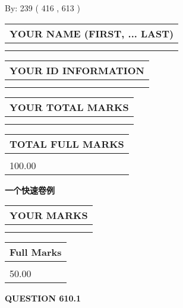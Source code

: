 \documentclass{ctexart}
\begin{document}
   
\hspace{1.0in} By: 
 239 ( 416 ,  613 )
   
   
   
   
\newpage 
\setcounter{page}{ 
   610001 } 
   
   
   
   
\noindent\begin{tabular}{|l|}
\hline
YOUR NAME (FIRST, ... LAST)  \\
\hline
 \\ 
 \\ 
\hline
\end{tabular}
\hspace{0.05in} \begin{tabular}{|l|}
\hline
 YOUR   ID   INFORMATION  \\
\hline
 \\ 
 \\ 
\hline
\end{tabular}
   
   
\vspace{0.2in}\noindent\begin{tabular}{|l|}
\hline
YOUR TOTAL MARKS  \\
\hline
 \\ 
 \\ 
\hline
\end{tabular}
\hspace{0.05in} \begin{tabular}{|l|}
\hline
TOTAL FULL MARKS  \\
\hline
 \\ 
100.00 \\
\hline
\end{tabular}
   
   
 \vspace{0.2in}
{\LARGE {\textbf{ 一个快速卷例}}}
   
   
  
\vspace{0.2in}
  
\noindent\begin{tabular}{|l|}
\hline
 YOUR MARKS  \\
\hline
 \\ 
 \\ 
\hline
\end{tabular}
\hspace{0.05in} \begin{tabular}{|l|}
\hline
 Full Marks  \\
\hline
 \\ 
50.00 \\
\hline
\end{tabular}
{\textbf{\Large{QUESTION
610.1 
}}}
  
\end{document}
